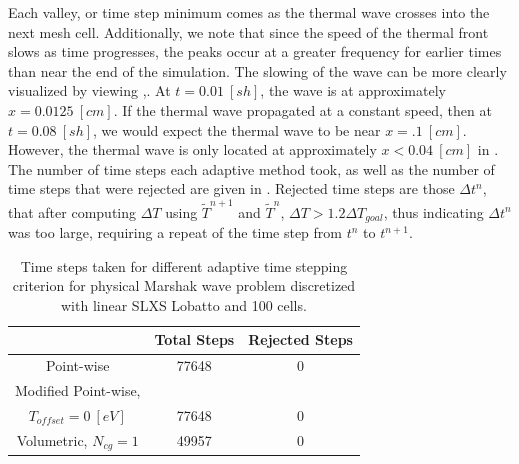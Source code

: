 Each valley, or time step minimum comes as the thermal wave crosses into the next mesh cell.
Additionally, we note that since the speed of the thermal front slows as time progresses, the peaks occur at a greater frequency for earlier times than near the end of the simulation.
The slowing of the wave can be more clearly visualized by viewing ,.
At $t=0.01 ~[sh]$, the wave is at approximately $x=0.0125~[cm]$.
If the thermal wave propagated at a constant speed, then at $t=0.08~[sh]$, we would expect the thermal wave to be near $x= .1~[cm]$.  
However, the thermal wave is only located at approximately $x<0.04~[cm]$ in .
The number of time steps each adaptive method took, as well as the number of time steps that were rejected are given in . 
Rejected time steps are those $\Delta t^n$, that after computing $\Delta T$ using $\widetilde{T}^{n+1}$ and $\widetilde{T}^n$, $\Delta T > 1.2 \Delta T_{goal}$, thus indicating $\Delta t^n$ was too large, requiring a repeat of the time step from $t^n$ to $t^{n+1}$.
\begin{table}[!htp]
\centering
\caption{Time steps taken for different adaptive time stepping criterion for physical Marshak wave problem discretized with linear SLXS Lobatto and 100 cells.}
\label{tbl:p1_steps}
\begin{tabular}{|c|c|c|}
\hline
{} &  Total Steps & Rejected Steps \\
\hline
Point-wise & 77648 & 0 \\
\hline
Modified Point-wise, &    &  \\
$T_{offset} = 0~[eV]$ &  77648  &  0\\
\hline
Volumetric, $N_{cg} = 1$ & 49957   & 0\\
\hline
\end{tabular}
\end{table}

